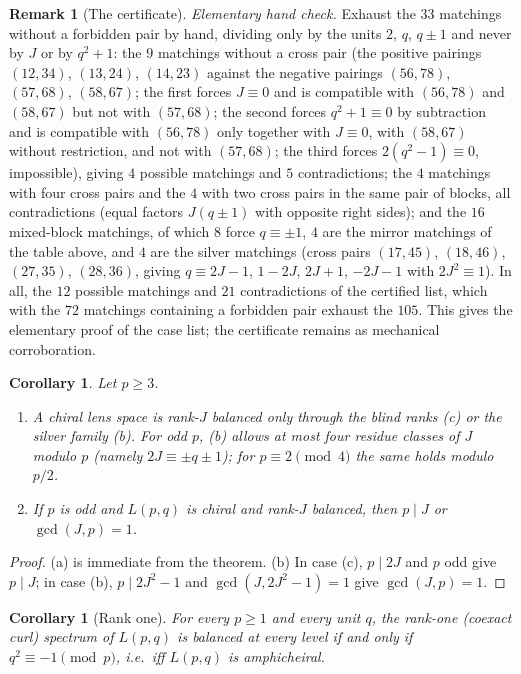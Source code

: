 \documentclass[11pt]{article}
\newtheorem{corollary}[theorem]{Corollary}
\theoremstyle{definition}
\newtheorem{remark}[theorem]{Remark}
\begin{document}
\begin{remark}[The certificate]
\emph{Elementary hand check.}  Exhaust the $33$
matchings without a forbidden pair by hand, dividing only by the units
$2$, $q$, $q\pm1$ and never by $J$ or by $q^2+1$: the $9$ matchings
without a cross pair (the positive pairings $(12,34)$, $(13,24)$,
$(14,23)$ against the negative pairings $(56,78)$, $(57,68)$, $(58,67)$;
the first forces $J\equiv0$ and is compatible with $(56,78)$ and
$(58,67)$ but not with $(57,68)$; the second forces $q^2+1\equiv0$ by
subtraction and is compatible with $(56,78)$ only together with
$J\equiv0$, with $(58,67)$ without restriction, and not with $(57,68)$;
the third forces $2(q^2-1)\equiv0$, impossible), giving $4$ possible
matchings and $5$ contradictions; the $4$ matchings with four cross
pairs and the $4$ with two cross pairs in the same pair of blocks, all
contradictions (equal factors $J(q\pm1)$ with opposite right sides); and
the $16$ mixed-block matchings, of which $8$ force $q\equiv\pm1$, $4$ are
the mirror matchings of the table above, and $4$ are the silver
matchings (cross pairs $(17,45)$, $(18,46)$, $(27,35)$, $(28,36)$, giving
$q\equiv2J-1$, $1-2J$, $2J+1$, $-2J-1$ with $2J^2\equiv1$).  In all, the
$12$ possible matchings and $21$ contradictions of the certified list,
which with the $72$ matchings containing a forbidden pair exhaust the
$105$.  This gives the
elementary proof of the case list; the certificate remains as
mechanical corroboration.
\end{remark}

\begin{corollary}
\label{cor:classification-consequences}
Let $p\geq3$.
\begin{enumerate}[label=(\alph*)]
\item A chiral lens space is rank-$J$ balanced only through the blind
ranks (c) or the silver family (b).  For odd $p$, (b) allows at most four
residue classes of $J$ modulo $p$ (namely $2J\equiv\pm q\pm1$); for
$p\equiv2\pmod4$ the same holds modulo $p/2$.
\item If $p$ is odd and $L(p,q)$ is chiral and rank-$J$ balanced, then
$p\mid J$ or $\gcd(J,p)=1$.
\end{enumerate}
\end{corollary}

\begin{proof}
(a) is immediate from the theorem.  (b) In case (c), $p\mid2J$ and $p$ odd
give $p\mid J$; in case (b), $p\mid2J^2-1$ and $\gcd(J,2J^2-1)=1$ give
$\gcd(J,p)=1$.
\end{proof}

\begin{corollary}[Rank one]
\label{cor:rank-one}
For every $p\geq1$ and every unit $q$, the rank-one (coexact curl)
spectrum of $L(p,q)$ is balanced at every level if and only if
$q^2\equiv-1\pmod p$, i.e.\ iff $L(p,q)$ is amphicheiral.
\end{corollary}
\end{document}

